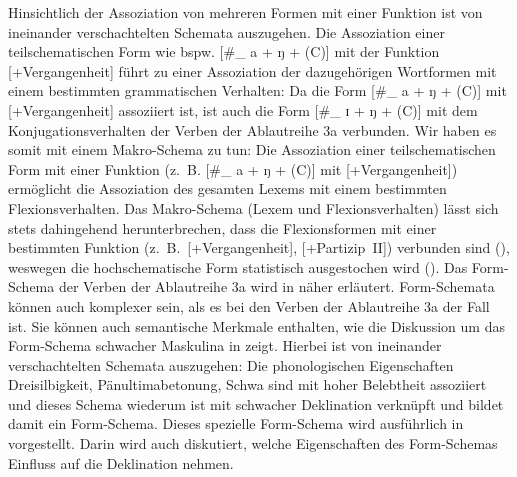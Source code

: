 Hinsichtlich der Assoziation von mehreren Formen mit einer Funktion ist von ineinander verschachtelten Schemata auszugehen. Die Assoziation einer teilschematischen Form wie bspw. [\#\_ a + ŋ + (C)] mit der Funktion [+Vergangenheit] führt zu einer Assoziation der dazugehörigen Wortformen mit einem bestimmten grammatischen Verhalten: Da die Form  [\#\_ a + ŋ + (C)] mit [+Vergangenheit] assoziiert ist, ist auch die Form [\#\_ ɪ + ŋ + (C)] mit dem Konjugationsverhalten der Verben der Ablautreihe 3a verbunden. Wir haben es somit mit einem Makro-Schema zu tun: Die Assoziation einer teilschematischen Form mit einer Funktion (z.~B. [\#\_ a + ŋ + (C)] mit [+Vergangenheit])  ermöglicht die Assoziation des gesamten Lexems mit einem bestimmten Flexionsverhalten. Das Makro-Schema (Lexem und Flexionsverhalten) lässt sich stets dahingehend herunterbrechen, dass die Flexionsformen mit einer bestimmten Funktion (z.~B.~[+Vergangenheit], [+Partizip~II]) verbunden sind (\cite[161]{Schmitt.2019}), weswegen die hochschematische Form statistisch ausgestochen wird (\cite[83--84]{Goldberg.2019}).  Das Form-Schema der Verben der Ablautreihe 3a wird in  näher erläutert. Form-Schemata können auch komplexer sein, als es bei den Verben der Ablautreihe 3a der Fall ist. Sie können auch semantische Merkmale enthalten, wie die Diskussion um das Form-Schema schwacher Maskulina in  zeigt. Hierbei ist von ineinander verschachtelten Schemata auszugehen: Die phonologischen Eigenschaften Dreisilbigkeit, Pänultimabetonung, Schwa sind mit hoher Belebtheit assoziiert und dieses Schema wiederum ist mit schwacher Deklination verknüpft und bildet damit ein Form-Schema. Dieses spezielle Form-Schema wird ausführlich in  vorgestellt. Darin wird auch diskutiert, welche Eigenschaften des Form-Schemas Einfluss auf die Deklination nehmen. 


